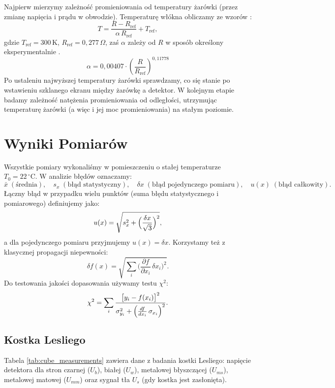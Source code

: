 \documentclass[12pt]{article}
\begin{document}
Najpierw mierzymy zależność promieniowania od temperatury żarówki (przez zmianę napięcia i prądu w obwodzie). Temperaturę włókna obliczamy ze wzorów \cite{skrypt}:
\begin{equation}
	T = \frac{R - R_{\mathrm{ref}}}{\alpha\,R_{\mathrm{ref}}} + T_{\mathrm{ref}},
	\label{eq:temp_bulb}
\end{equation}
gdzie $T_{\mathrm{ref}}=300\,\mathrm{K}$, $R_{\mathrm{ref}}=0{,}277\,\Omega$, zaś $\alpha$ zależy od $R$ w sposób określony eksperymentalnie \cite{skrypt}. 
\[
    \alpha = 0{,}00407\cdot \left(\frac{R}{R_{\mathrm{ref}}}\right)^{0{,}11778}
\]
Po ustaleniu najwyższej temperatury żarówki sprawdzamy, co się stanie po wstawieniu szklanego ekranu między żarówkę a detektor. 
W kolejnym etapie badamy zależność natężenia promieniowania od odległości, utrzymując temperaturę żarówki (a więc i jej moc promieniowania) na stałym poziomie.

\section{Wyniki Pomiarów}
Wszystkie pomiary wykonaliśmy w pomieszczeniu o stałej temperaturze $T_0 = 22\,^\circ\mathrm{C}$. W analizie błędów oznaczamy:
\[
\bar{x} \;(\text{średnia}),\quad s_x \;(\text{błąd statystyczny}),\quad \delta x \;(\text{błąd pojedynczego pomiaru}),\quad u(x)\;(\text{błąd całkowity}).
\]
Łączny błąd w przypadku wielu punktów (suma błędu statystycznego i pomiarowego) definiujemy jako:
\begin{equation}
	u(x) = \sqrt{s_x^2 + \Bigl(\frac{\delta x}{\sqrt{3}}\Bigr)^2},
	\label{eq:combined_error}
\end{equation}
a dla pojedynczego pomiaru przyjmujemy $u(x) = \delta x$. Korzystamy też z klasycznej propagacji niepewności:
\begin{equation}
	\delta f(x) = \sqrt{\sum_{i}\bigl(\frac{\partial f}{\partial x_i}\,\delta x_i\bigr)^2}.
	\label{eq:error_propagation}
\end{equation}
Do testowania jakości dopasowania używamy testu $\chi^2$:
\begin{equation}
	\chi^2 = \sum_{i} \frac{\bigl[y_i - f(x_i)\bigr]^2}{\sigma_{y_i}^2 + \Bigl(\frac{df}{dx_i}\,\sigma_{x_i}\Bigr)^2}.
	\label{eq:chi2}
\end{equation}

\subsection{Kostka Lesliego}
Tabela \ref{tab:cube_measurements} zawiera dane z badania kostki Lesliego: napięcie detektora dla stron czarnej ($U_b$), białej ($U_w$), metalowej błyszczącej ($U_{ms}$), metalowej matowej ($U_{mm}$) oraz sygnał tła $U_s$ (gdy kostka jest zasłonięta).
\end{document}
